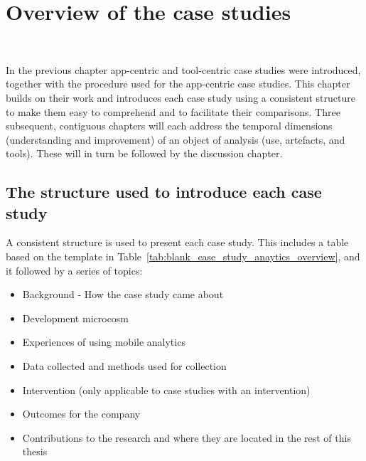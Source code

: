 \chapter{Overview of the case studies}~\label{chapter-case-studies-overview}

In the previous chapter app-centric and tool-centric case studies were introduced, together with the procedure used for the app-centric case studies. This chapter builds on their work and introduces each case study using a consistent structure to make them easy to comprehend and to facilitate their comparisons. Three subsequent, contiguous chapters will each address the temporal dimensions (understanding and improvement) of an object of analysis (use, artefacts, and tools). These will in turn be followed by the discussion chapter.


\section{The structure used to introduce each case study}
A consistent structure is used to present each case study. This includes a table based on the template in Table~\ref{tab:blank_case_study_anaytics_overview}, and it followed by a series of topics:
\begin{itemize}
    \itemsep0em
    \item Background - How the case study came about
    \item Development microcosm
    \item Experiences of using mobile analytics
    \item Data collected and methods used for collection
    \item Intervention (only applicable to case studies with an intervention)
    \item Outcomes for the company
    \item Contributions to the research and where they are located in the rest of this thesis
\end{itemize}


